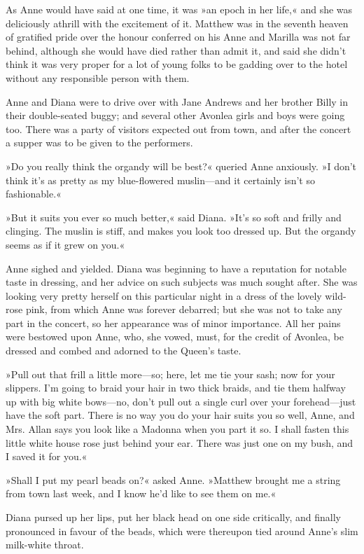 As Anne would have said at one time, it was »an epoch in her life,« and she was deliciously athrill with the excitement of it. Matthew was in the seventh heaven of gratified pride over the honour conferred on his Anne and Marilla was not far behind, although she would have died rather than admit it, and said she didn't think it was very proper for a lot of young folks to be gadding over to the hotel without any responsible person with them.

Anne and Diana were to drive over with Jane Andrews and her brother Billy in their double-seated buggy; and several other Avonlea girls and boys were going too. There was a party of visitors expected out from town, and after the concert a supper was to be given to the performers.

»Do you really think the organdy will be best?« queried Anne anxiously. »I don't think it's as pretty as my blue-flowered muslin—and it certainly isn't so fashionable.«

»But it suits you ever so much better,« said Diana. »It's so soft and frilly and clinging. The muslin is stiff, and makes you look too dressed up. But the organdy seems as if it grew on you.«

Anne sighed and yielded. Diana was beginning to have a reputation for notable taste in dressing, and her advice on such subjects was much sought after. She was looking very pretty herself on this particular night in a dress of the lovely wild-rose pink, from which Anne was forever debarred; but she was not to take any part in the concert, so her appearance was of minor importance. All her pains were bestowed upon Anne, who, she vowed, must, for the credit of Avonlea, be dressed and combed and adorned to the Queen's taste.

»Pull out that frill a little more—so; here, let me tie your sash; now for your slippers. I'm going to braid your hair in two thick braids, and tie them halfway up with big white bows—no, don't pull out a single curl over your forehead—just have the soft part. There is no way you do your hair suits you so well, Anne, and Mrs. Allan says you look like a Madonna when you part it so. I shall fasten this little white house rose just behind your ear. There was just one on my bush, and I saved it for you.«

»Shall I put my pearl beads on?« asked Anne. »Matthew brought me a string from town last week, and I know he'd like to see them on me.«

Diana pursed up her lips, put her black head on one side critically, and finally pronounced in favour of the beads, which were thereupon tied around Anne's slim milk-white throat.

